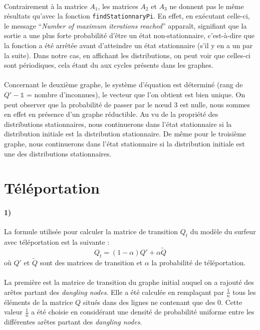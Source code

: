 \documentclass[a4paper,titlepage]{report}
\begin{document}
\paragraph{}
Contrairement à la matrice $A_1$, les matrices $A_2$ et $A_3$ ne donnent pas le même résultats qu'avec la fonction \texttt{findStationnaryPi}. En effet, en exécutant celle-ci, le message ``\textit{Number of maximum iterations reached}'' apparaît, signifiant que la sortie a une plus forte probabilité d'être un état non-stationnaire, c'est-à-dire que la fonction a été arrêtée avant d'atteindre un état stationnaire (s'il y en a un par la suite). Dans notre cas, en affichant les distributions, on peut voir que celles-ci sont périodiques, cela étant du aux cycles présents dans les graphes.
\paragraph{}
Concernant le deuxième graphe, le système d'équation est déterminé (rang de $Q' - \mathbb{1}$ = nombre d'inconnues), le vecteur que l'on obtient est bien unique. On peut observer que la probabilité de passer par le nœud 3 est nulle, nous sommes en effet en présence d'un graphe réductible. Au vu de la propriété des distributions stationnaires, nous continuerons dans l'état stationnaire si la distribution initiale est la distribution stationnaire. De même pour le troisième graphe, nous continuerons dans l'état stationnaire si la distribution initiale est une des distributions stationnaires.

\section{Téléportation}
\label{sec:teleport}
\paragraph{1)}
La formule utilisée pour calculer la matrice de transition $Q_t$ du modèle du surfeur avec téléportation est la suivante :
\[
	Q_t = (1 - \alpha) Q' + \alpha \tilde{Q}
\]
où $Q'$ et $\tilde{Q}$ sont des matrices de transition et $\alpha$ la probabilité de téléportation. 
\paragraph{}
La première est la matrice de transition du graphe initial auquel on a rajouté des arêtes partant des \textit{dangling nodes}. Elle a été calculée en remplaçant par $\frac{1}{n}$ tous les éléments de la matrice $Q$ situés dans des lignes ne contenant que des 0. Cette valeur $\frac{1}{n}$ a été choisie en considérant une densité de probabilité uniforme entre les différentes arêtes partant des \textit{dangling nodes}. 
\end{document}

